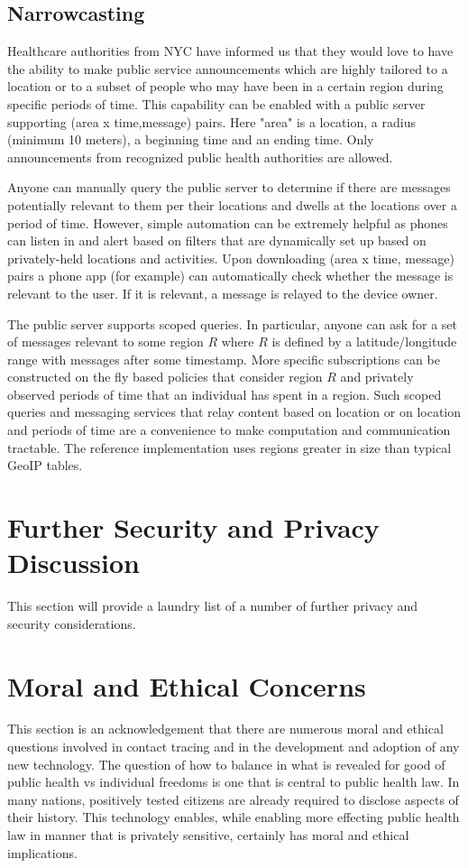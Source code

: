 \documentclass{article}
\begin{document}
\subsection{Narrowcasting}

Healthcare authorities from NYC have informed us that they would love to have the ability to make public service announcements which are highly tailored to a location or to a subset of people who may have been in a certain region during specific periods of time.  This capability can be enabled with a public server supporting (area x time,message) pairs.  Here "area" is a location, a radius (minimum 10 meters), a beginning time and an ending time.  Only announcements from recognized public health authorities are allowed.  

Anyone can manually query the public server to determine if there are messages potentially relevant to them per their locations and dwells at the locations over a period of time. However, simple automation can be extremely helpful as phones can listen in and alert based on filters that are dynamically set up based on privately-held locations and activities. Upon downloading (area x time, message) pairs a phone app (for example) can automatically check whether the message is relevant to the user.  If it is relevant, a message is relayed to the device owner.

The public server supports scoped queries.  In particular, anyone can ask for a set of messages relevant to some region $R$ where $R$ is defined by a latitude/longitude range with messages after some timestamp.  More specific subscriptions can be constructed on the fly based policies that consider region $R$ and privately observed periods of time that an individual has spent in a region. Such scoped queries and messaging services that relay content based on location or on location and periods of time are a convenience to make computation and communication tractable.  The reference implementation uses regions greater in size than typical GeoIP tables.

\section{Further Security and Privacy Discussion}
This section will provide a laundry list of a number of further privacy and security considerations.

\section{Moral and Ethical Concerns}
This section is an acknowledgement that there are numerous moral and ethical questions involved in contact tracing and in the development and adoption of any new technology. The question of how to balance in what is revealed for good of public health vs individual freedoms is one that is central to public health law. In many nations, positively tested citizens are already required to disclose aspects of their history.  This technology enables, while enabling more effecting public health law in manner that is privately sensitive, certainly has moral and ethical implications.  
\end{document}
